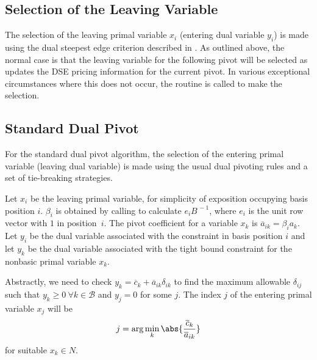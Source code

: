 \subsection{Selection of the Leaving Variable}

The selection of the leaving primal variable $x_i$ (entering dual
variable $y_i$) is made using the dual steepest edge criterion
described in .
As outlined above, the normal case is that the leaving variable for the
following pivot will
be selected as  updates the DSE pricing information
for the current pivot.
In various exceptional circumstances where this does not occur, the routine
 is called to make the selection.

\subsection{Standard Dual Pivot}
\label{sec:DualStdSelectInVar}

For the standard dual pivot algorithm, the selection of the entering
primal variable (leaving dual variable) is
made using the usual dual pivoting rules and a set of tie-breaking strategies.

Let $x_i$ be the leaving primal variable, for simplicity of exposition
occupying basis position $i$.
$\beta_{i}$ is obtained by calling  to calculate
$e_{i}B^{\,-1}$, where $e_{i}$ is the unit row vector
with $1$ in position~${i}$.
The pivot coefficient for a variable $x_k$ is
$\overline{a}_{ik} = \beta_i a_k$.
Let $y_i$ be the dual variable associated with the constraint in basis
position $i$ and
let $y_k$ be the dual variable associated with the tight bound constraint
for the nonbasic primal variable $x_k$.

Abstractly, we need to check
$y_k = \overline{c}_k + \overline{a}_{ik}\delta_{ik}$ to
find the maximum allowable $\delta_{ij}$ such that
$y_k \geq 0 \: \forall k \in \mathcal{B}$ and $y_j = 0$ for some $j$.
The index $j$ of the entering primal variable $x_j$ will be
\begin{equation} \label{eq:AbstractDualPivot}
j = \arg \mathop{\min}_{k} \abs{\frac{\overline{c}_k}{\overline{a}_{ik}}}
\end{equation}
for suitable $x_k \in N$.


